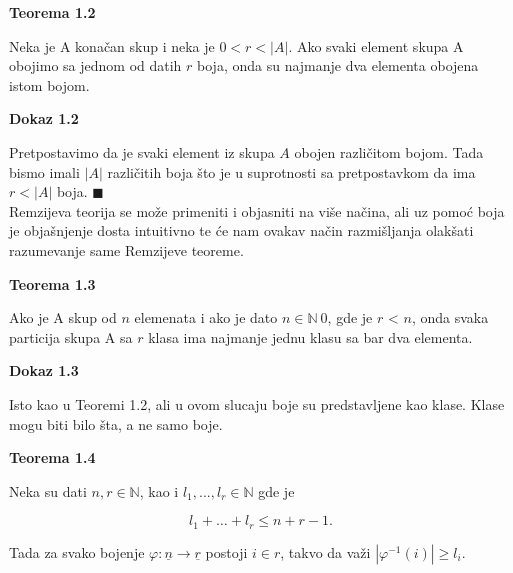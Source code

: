 \documentclass[12pt,a4paper]{article}
\begin{document}
	\vspace{0.5em}
	{\noindent\fontsize{12pt}{12pt}\textbf{Teorema 1.2}}
	\vspace{0.5em}

	\noindent Neka je A konačan skup i neka je $0 < r < |A|$.
	Ako svaki element skupa A obojimo sa jednom od datih $r$ boja, onda su najmanje dva
	elementa obojena istom bojom.
	\vspace{1.5em}

	{\noindent\fontsize{12pt}{12pt}\textbf{Dokaz 1.2}}
	\vspace{0.5em}	

	\noindent Pretpostavimo da je svaki element iz skupa $A$ obojen različitom bojom. Tada bismo
	imali $|A|$ različitih boja što je u suprotnosti sa pretpostavkom da ima $r < |A|$ boja.	$\blacksquare$\\

	\noindent Remzijeva teorija se može primeniti i objasniti na više načina, ali uz pomoć boja 
	je objašnjenje dosta intuitivno te će nam ovakav način razmišljanja olakšati razumevanje same Remzijeve teoreme.

	\vspace{0.5em}
	{\noindent\fontsize{12pt}{12pt}\textbf{Teorema 1.3}}
	\vspace{0.5em}

	\noindent Ako je A skup od $n$ elemenata i ako je dato $n \in \mathbb{N}\ {0}$, gde je $r$ < $n$, onda svaka particija
	skupa A sa $r$ klasa ima najmanje jednu klasu sa bar dva elementa.
	\vspace{1.5em}

	{\noindent\fontsize{12pt}{12pt}\textbf{Dokaz 1.3}}
	\vspace{0.5em}

	\noindent Isto kao u Teoremi 1.2, ali u ovom slucaju boje su predstavljene kao klase.
	Klase mogu biti bilo šta, a ne samo boje.

	\vspace{0.5em}
	{\noindent\fontsize{12pt}{12pt}\textbf{Teorema 1.4}}
	\vspace{0.5em}

	\noindent Neka su dati $n, r \in \mathbb{N}$, kao i $l_{1},...,l_{r} \in \mathbb{N}$ gde je
	
	\[l_{1}+\dots+l_{r} \leq n+r-1.\]

	\noindent Tada za svako bojenje $\varphi:\underline{n} \rightarrow \underline{r}$ postoji $i \in r$, takvo da važi $|\varphi^{-1}(i)| \geq l_{i}.$
	\vspace{1.5em}
\end{document}
